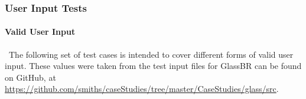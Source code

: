 \documentclass[12pt, titlepage]{article}
\newcommand{\progname}{GlassBR}
\begin{document}
\subsubsection{User Input Tests}\label{sec_CalcTCs}

\paragraph{Valid User Input}

~\newline \noindent The following set of test cases is intended to cover 
different forms of valid user input. These values were 
taken from the test input files for \progname{} can be found on GitHub, at 
\href{https://github.com/smiths/caseStudies/tree/master/CaseStudies/glass/src}
{https://github.com/smiths/caseStudies/tree/master/CaseStudies/glass/src}.   
\end{document}

